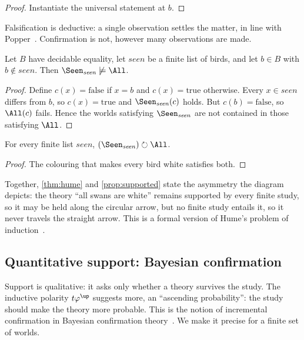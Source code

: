 \begin{proof}
Instantiate the universal statement at $b$.
\end{proof}

Falsification is deductive: a single observation settles the matter, in line with
Popper~\cite{popper}. Confirmation is not, however many observations are made.

\begin{theorem}\label{thm:hume}
Let $B$ have decidable equality, let $\mathit{seen}$ be a finite list of birds, and let
$b\in B$ with $b\notin\mathit{seen}$. Then $\Seen_{\mathit{seen}}\not\models\All$.
\end{theorem}

\begin{proof}
Define $c(x)=\mathrm{false}$ if $x=b$ and $c(x)=\mathrm{true}$ otherwise. Every $x\in\mathit{seen}$
differs from $b$, so $c(x)=\mathrm{true}$ and $\Seen_{\mathit{seen}}(c)$ holds. But
$c(b)=\mathrm{false}$, so $\All(c)$ fails. Hence the worlds satisfying
$\Seen_{\mathit{seen}}$ are not contained in those satisfying $\All$.
\end{proof}

\begin{proposition}\label{prop:supported}
For every finite list $\mathit{seen}$, $(\Seen_{\mathit{seen}})\circlearrowright\All$.
\end{proposition}

\begin{proof}
The colouring that makes every bird white satisfies both.
\end{proof}

Together, \cref{thm:hume} and \cref{prop:supported} state the asymmetry the diagram depicts:
the theory ``all swans are white'' remains supported by every finite study, so it may be held along
the circular arrow, but no finite study entails it, so it never travels the straight arrow. This is
a formal version of Hume's problem of induction~\cite{hume}.

\subsection{Quantitative support: Bayesian confirmation}\label{sec:confirmation}

Support is qualitative: it asks only whether a theory survives the study. The inductive
polarity $t\varphi^{\up}$ suggests more, an ``ascending probability'': the study should make the
theory more probable. This is the notion of incremental confirmation in Bayesian confirmation
theory~\cite{carnap,earman,fitelson}. We make it precise for a finite set of worlds.

